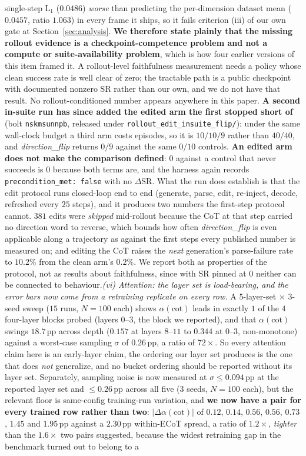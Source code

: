 \documentclass{article}
\begin{document}
single-step L$_1$ ($0.0486$) \emph{worse} than predicting the per-dimension dataset mean ($0.0457$, ratio $1.063$) in every frame it ships, so it fails criterion (iii) of our own gate at Section~\ref{sec:analysis}. \textbf{We therefore state plainly that the missing rollout evidence is a checkpoint-competence problem and not a compute or suite-availability problem}, which is how four earlier versions of this item framed it. A rollout-level faithfulness measurement needs a policy whose clean success rate is well clear of zero; the tractable path is a public checkpoint with documented nonzero SR rather than our own, and we do not have that result. No rollout-conditioned number appears anywhere in this paper. \textbf{A second in-suite run has since added the edited arm the first stopped short of} (bolt \texttt{nskmsunnpb}, released under \texttt{rollout\_edit\_insuite\_flip/}): under the same wall-clock budget a third arm costs episodes, so it is $10/10/9$ rather than $40/40$, and \emph{direction\_flip} returns $0/9$ against the same $0/10$ controls. \textbf{An edited arm does not make the comparison defined}: $0$ against a control that never succeeds is $0$ because both terms are, and the harness again records \texttt{precondition\_met: false} with no $\Delta$SR. What the run does establish is that the edit protocol runs closed-loop end to end (generate, parse, edit, re-inject, decode, refreshed every $25$ steps), and it produces two numbers the first-step protocol cannot. $381$ edits were \emph{skipped} mid-rollout because the CoT at that step carried no direction word to reverse, which bounds how often \emph{direction\_flip} is even applicable along a trajectory as against the first steps every published number is measured on; and editing the CoT raises the \emph{next} generation's parse-failure rate to $10.2\%$ from the clean arm's $0.2\%$. We report both as properties of the protocol, not as results about faithfulness, since with SR pinned at $0$ neither can be connected to behaviour.\emph{(vi) Attention: the layer set is load-bearing, and the error bars now come from a retraining replicate on every row.} A $5$-layer-set $\times$ $3$-seed sweep ($15$ runs, $N{=}100$ each) shows $\alpha(\text{cot})$ leads in exactly $1$ of the $4$ four-layer blocks probed (layers $0$--$3$, the block we reported), and that $\alpha(\text{cot})$ swings $18.7$\,pp across depth ($0.157$ at layers $8$--$11$ to $0.344$ at $0$--$3$, non-monotone) against a worst-case sampling $\sigma$ of $0.26$\,pp, a ratio of $72\times$. So every attention claim here is an early-layer claim, the ordering our layer set produces is the one that does \emph{not} generalize, and no bucket ordering should be reported without its layer set. Separately, sampling noise is now measured at $\sigma \leq 0.094$\,pp at the reported layer set and $\leq 0.26$\,pp across all five (3 seeds, $N{=}100$ each), but the relevant floor is same-config training-run variation, and \textbf{we now have a pair for every trained row rather than two}: $|\Delta\alpha(\text{cot})|$ of $0.12$, $0.14$, $0.56$, $0.56$, $0.73$, $1.45$ and $1.95$\,pp against a $2.30$\,pp within-ECoT spread, a ratio of $1.2\times$, \emph{tighter} than the $1.6\times$ two pairs suggested, because the widest retraining gap in the benchmark turned out to belong to a 
\end{document}
